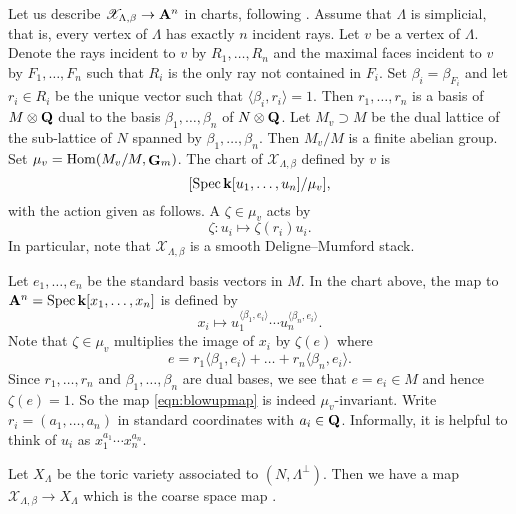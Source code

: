 \documentclass{amsart}
\renewcommand{\k}{\mathbf k}
\DeclareMathOperator{\G}{\mathbf G}
\begin{document}
Let us describe \(\mathscr X_{\Lambda, \beta} \to {\bf A}^n\) in charts, following \cite[Proposition~4.3]{bor.che.smi:05}.
Assume that \(\Lambda\) is simplicial, that is, every vertex of \(\Lambda\) has exactly \(n\) incident rays.
Let \(v\) be a vertex of \(\Lambda\).
Denote the rays incident to \(v\) by \(R_1, \dots, R_n\) and the maximal faces incident to \(v\) by \(F_1, \dots, F_n\) such that \(R_i\) is the only ray not contained in \(F_i\).
Set \(\beta_i = \beta_{F_i}\) and let \(r_i \in R_i\) be the unique vector such that \(\langle \beta_i, r_i \rangle = 1\).
Then \(r_1, \dots, r_n\) is a basis of \(M \otimes {\bf Q}\) dual to the basis \(\beta_1, \dots, \beta_n\) of \(N \otimes {\bf Q}\).
Let \(M_v \supset M\) be the dual lattice of the sub-lattice of \(N\) spanned by \(\beta_1, \dots, \beta_n\).
Then \(M_v/M\) is a finite abelian group.
Set \(\mu_v = \Hom(M_v/M, \G_m)\).
The chart of \(\mathscr X_{\Lambda, \beta}\) defined by \(v\) is
\begin{equation}\label{eqn:chart}
  [\spec \k[u_1, \dots, u_n] / \mu_v],
\end{equation}
with the action given as follows.
A \(\zeta \in \mu_v\) acts by
\[\zeta \colon u_i \mapsto \zeta(r_i) u_i.\]
In particular, note that \(\mathscr X_{\Lambda, \beta}\) is a smooth Deligne--Mumford stack.

Let \(e_1, \dots, e_n\) be the standard basis vectors in \(M\).
In the chart above, the map to \(\A^n = \spec \k[x_1,\dots,x_n]\) is defined by
\begin{equation}\label{eqn:blowupmap}
  x_i \mapsto u_1^{\langle \beta_1, e_i \rangle} \cdots u_n^{\langle \beta_n, e_i \rangle}.
\end{equation}
Note that \(\zeta \in \mu_v\) multiplies the image of \(x_i\) by \(\zeta(e)\) where
\[ e = r_1 \langle \beta_1, e_i  \rangle + \dots + r_n\langle  \beta_n,e_i\rangle.\]
Since \(r_1, \dots, r_n\) and \(\beta_1,\dots,\beta_n\) are dual bases, we see that \(e = e_i \in M\) and hence \(\zeta(e) = 1\).
So the map \eqref{eqn:blowupmap} is indeed \(\mu_v\)-invariant.
Write \(r_i = (a_1,\dots,a_n)\) in standard coordinates with \(a_i \in {\bf Q}\).
Informally, it is helpful to think of 
\( u_i\) as \(x_1^{a_1} \cdots x_n^{a_n}\).

Let \(X_{\Lambda}\) be the toric variety associated to \((N, \Lambda^\perp)\).
Then we have a map
\(\mathscr X_{\Lambda, \beta} \to X_{\Lambda}\)
which is the coarse space map \cite[Proposition~3.7]{bor.che.smi:05}.
\end{document}
